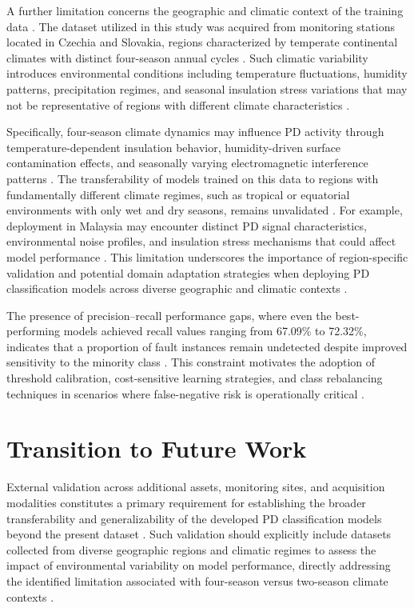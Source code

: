 A further limitation concerns the geographic and climatic context of the training data \parencite{Florkowski_2024, Sikorski_2025}. 
The dataset utilized in this study was acquired from monitoring stations located in Czechia and Slovakia, regions characterized by temperate continental climates with distinct four-season annual cycles \parencite{Florkowski_2024, Sikorski_2025}. 
Such climatic variability introduces environmental conditions including temperature fluctuations, humidity patterns, precipitation regimes, and seasonal insulation stress variations that may not be representative of regions with different climate characteristics \parencite{Orellana_2023_1, Azam_2024}.

Specifically, four-season climate dynamics may influence PD activity through temperature-dependent insulation behavior, humidity-driven surface contamination effects, and seasonally varying electromagnetic interference patterns \parencite{Orellana_2023_1, Florkowski_2024}. 
The transferability of models trained on this data to regions with fundamentally different climate regimes, such as tropical or equatorial environments with only wet and dry seasons, remains unvalidated \parencite{Azam_2024, Florkowski_2024}. 
For example, deployment in Malaysia may encounter distinct PD signal characteristics, environmental noise profiles, and insulation stress mechanisms that could affect model performance \parencite{Azam_2024, Florkowski_2024}. 
This limitation underscores the importance of region-specific validation and potential domain adaptation strategies when deploying PD classification models across diverse geographic and climatic contexts \parencite{Seitz_2024_1, Friebe_2024}.

The presence of precision--recall performance gaps, where even the best-performing models achieved recall values ranging from 67.09\% to 72.32\%, indicates that a proportion of fault instances remain undetected despite improved sensitivity to the minority class \parencite{Zemouri_2023_1, Aldosari_2023}. 
This constraint motivates the adoption of threshold calibration, cost-sensitive learning strategies, and class rebalancing techniques in scenarios where false-negative risk is operationally critical \parencite{Zemouri_2023_1, Adhikari_2024}.

\section{Transition to Future Work}

External validation across additional assets, monitoring sites, and acquisition modalities constitutes a primary requirement for establishing the broader transferability and generalizability of the developed PD classification models beyond the present dataset \parencite{Seitz_2024_1, Sikorski_2025}. 
Such validation should explicitly include datasets collected from diverse geographic regions and climatic regimes to assess the impact of environmental variability on model performance, directly addressing the identified limitation associated with four-season versus two-season climate contexts \parencite{Azam_2024, Florkowski_2024}.

